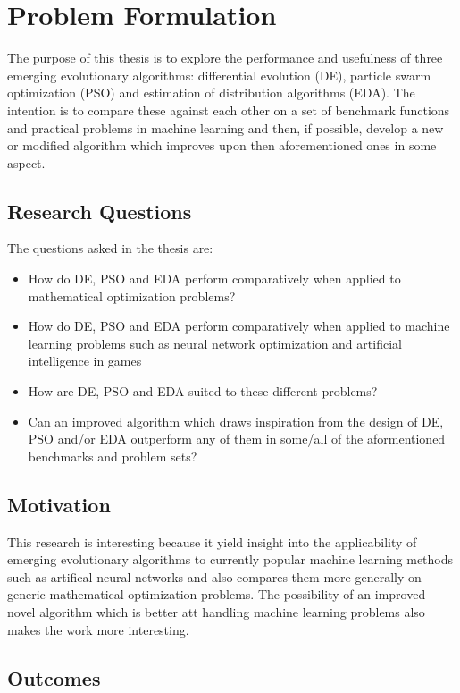 \section{Problem Formulation}

The purpose of this thesis is to explore the performance and usefulness of three emerging evolutionary algorithms: differential evolution (DE), particle swarm optimization (PSO) and estimation of distribution algorithms (EDA). The intention is to compare these against each other on a set of benchmark functions and practical problems in machine learning and then, if possible, develop a new or modified algorithm which improves upon then aforementioned ones in some aspect.

\subsection{Research Questions}

The questions asked in the thesis are:
\begin{itemize}
  \item How do DE, PSO and EDA perform comparatively when applied to mathematical optimization problems?
  \item How do DE, PSO and EDA perform comparatively when applied to machine learning problems such as neural network optimization and artificial intelligence in games
  \item How are DE, PSO and EDA suited to these different problems?
  \item Can an improved algorithm which draws inspiration from the design of DE, PSO and/or EDA outperform any of them in some/all of the aformentioned benchmarks and problem sets?
\end{itemize}

\subsection{Motivation}

This research is interesting because it yield insight into the applicability of emerging evolutionary algorithms to currently popular machine learning methods such as artifical neural networks and also compares them more generally on generic mathematical optimization problems. The possibility of an improved novel algorithm which is better att handling machine learning problems also makes the work more interesting.

\subsection{Outcomes}

